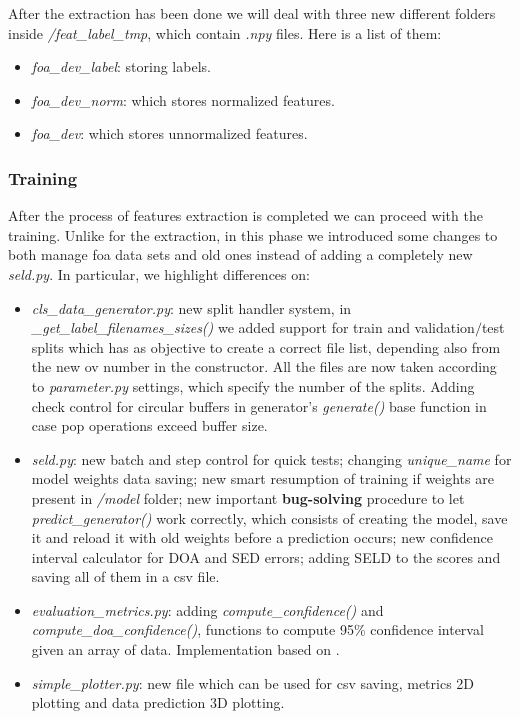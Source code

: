 \documentclass[11pt]{article}
\begin{document}
\noindent
After the extraction has been done we will deal with three new different folders inside \textit{/feat\_label\_tmp}, which contain \textit{.npy} files. Here is a list of them: 

\begin{itemize}
	\item \textit{foa\_dev\_label}: storing labels.
	\item \textit{foa\_dev\_norm}: which stores normalized features.
	\item \textit{foa\_dev}: which stores unnormalized features.
\end{itemize}



\subsubsection{Training}\label{minisec:train}

After the process of features extraction is completed we can proceed with the training. Unlike for the extraction, in this phase we introduced some changes to both manage foa data sets and old ones instead of adding a completely new \textit{seld.py}. In particular, we highlight differences on:

\begin{itemize}
	\item \textit{cls\_data\_generator.py}: new split handler system, in \textit{\_get\_label\_filenames\_sizes()} we added support for train and validation$/$test splits which has as objective to create a correct file list, depending also from the new ov number in the constructor. All the files are now taken according to \textit{parameter.py} settings, which specify the number of the splits. Adding check control for circular buffers in generator's \textit{generate()} base function in case pop operations exceed buffer size.
	\item \textit{seld.py}: new batch and step control for quick tests; changing \textit{unique\_name} for model weights data saving; new smart resumption of training if weights are present in \textit{/model} folder; new important \textbf{bug-solving} procedure to let \textit{predict\_generator()} work correctly, which consists of creating the model, save it and reload it with old weights before a prediction occurs; new confidence interval calculator for DOA and SED errors; adding SELD to the scores and saving all of them in a csv file.
	\item \textit{evaluation\_metrics.py}: adding \textit{compute\_confidence()} and\\ \textit{compute\_doa\_confidence()}, functions to compute 95\% confidence interval given an array of data. Implementation based on \cite{confint}.
	\item \textit{simple\_plotter.py}: new file which can be used for csv saving, metrics 2D plotting and data prediction 3D plotting.
\end{itemize}
\end{document}
